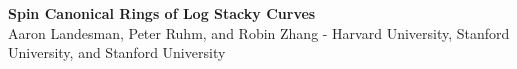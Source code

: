 \documentclass[a0,landscape]{a0poster}
\theoremstyle{definition}
\begin{document}
	\begin{center}
		\begin{minipage}[b]{\linewidth}
	\begin{center}
			\veryHuge \color{emoryBlue} \textbf{Spin Canonical Rings of Log Stacky Curves} \color{black}\\ 
			\Large Aaron Landesman, Peter Ruhm, and Robin Zhang \hskip 1cm - \hskip 1cm Harvard University, Stanford University, and Stanford University \\
		\end{center}
		\end{minipage}
	\end{center}
	\vspace{1cm} 
\end{document}
